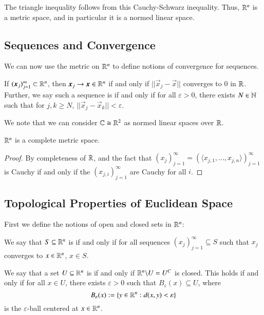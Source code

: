 The triangle inequality follows from this Cauchy-Schwarz inequality. Thus, $\mathbb R^n$ is a metric space, and in particular it is a normed linear space.

\subsection{Sequences and Convergence}

We can now use the metric on $\mathbb R^n$ to define notions of convergence for sequences.

\begin{definition}
    If $(\vec{x}_j)_{j=1}^{\infty} \subset \R^n$, then $\vec{x}_j\rightarrow \vec{x} \in \R^n$ if and only if $||\vec{x}_j-\vec{x}||$ converges to $0$ in $\mathbb R$. Further, we say such a sequence is  if and only if for all $\varepsilon > 0$, there exists $N \in \mathbb N$ such that for $j,k \geq N$, $||\vec{x}_j - \vec{x}_k|| < \varepsilon$.
\end{definition}

We note that we can consider $\mathbb C \cong \mathbb R^2$ as normed linear spaces over $\mathbb R$.

\begin{proposition}
    $\mathbb R^n$ is a complete metric space.
\end{proposition}
\begin{proof}
    By completeness of $\mathbb R$, and the fact that $(x_j)_{j=1}^{\infty} = (\langle x_{j,1},...,x_{j,n}\rangle)_{j=1}^{\infty}$ is Cauchy if and only if the $(x_{j,i})_{j=1}^{\infty}$ are Cauchy for all $i$.
\end{proof}

\subsection{Topological Properties of Euclidean Space}

First we define the notions of open and closed sets in $\mathbb R^n$: 

\begin{definition}
    We say that $S \subseteq \mathbb R^n$ is  if and only if for all sequences $(x_j)_{j=1}^{\infty} \subseteq S$ such that $x_j$ converges to $x \in \mathbb R^n$, $x \in S$.
\end{definition}

\begin{definition}
    We say that a set $U \subseteq \mathbb R^n$ is  if and only if $\mathbb R^n\backslash U = U^C$ is closed. This holds if and only if for all $x \in U$, there exists $\varepsilon > 0$ such that $B_{\varepsilon}(x) \subseteq U$, where \begin{equation*}
        B_{\varepsilon}(x) := \{y \in \mathbb R^n:d(x,y) < \varepsilon\}
    \end{equation*}
    is the $\varepsilon$-ball centered at $x \in \mathbb R^n$.
\end{definition}

